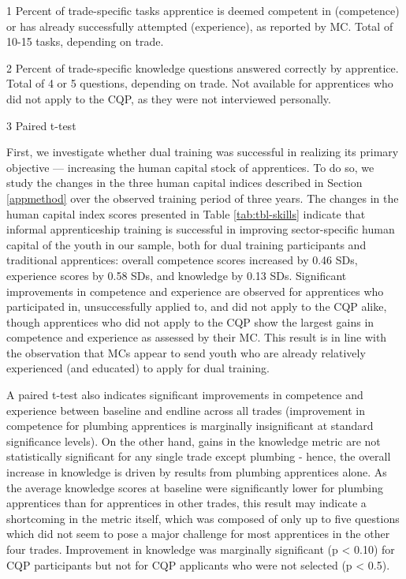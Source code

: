 \documentclass[
  11pt,
a4paper
]{article}
\begin{document}
\begin{table}[H]
{\begin{threeparttable}
\begin{tablenotes}
\item[1] Percent of trade-specific tasks apprentice is deemed competent in (competence) or has already successfully attempted (experience), as reported by MC. Total of 10-15 tasks, depending on trade.
\item[2] Percent of trade-specific knowledge questions answered correctly by apprentice. Total of 4 or 5 questions, depending on trade. Not available for apprentices who did not apply to the CQP, as they were not interviewed personally.
\item[3] Paired t-test
\end{tablenotes}
\end{threeparttable}}
\end{table}

First, we investigate whether dual training was successful in realizing its primary objective --- increasing the human capital stock of apprentices. To do so, we study the changes in the three human capital indices described in Section \ref{appmethod} over the observed training period of three years. The changes in the human capital index scores presented in Table \ref{tab:tbl-skills} indicate that informal apprenticeship training is successful in improving sector-specific human capital of the youth in our sample, both for dual training participants and traditional apprentices: overall competence scores increased by 0.46 SDs, experience scores by 0.58 SDs, and knowledge by 0.13 SDs. Significant improvements in competence and experience are observed for apprentices who participated in, unsuccessfully applied to, and did not apply to the CQP alike, though apprentices who did not apply to the CQP show the largest gains in competence and experience as assessed by their MC. This result is in line with the observation that MCs appear to send youth who are already relatively experienced (and educated) to apply for dual training.

A paired t-test also indicates significant improvements in competence and experience between baseline and endline across all trades (improvement in competence for plumbing apprentices is marginally insignificant at standard significance levels). On the other hand, gains in the knowledge metric are not statistically significant for any single trade except plumbing - hence, the overall increase in knowledge is driven by results from plumbing apprentices alone. As the average knowledge scores at baseline were significantly lower for plumbing apprentices than for apprentices in other trades, this result may indicate a shortcoming in the metric itself, which was composed of only up to five questions which did not seem to pose a major challenge for most apprentices in the other four trades. Improvement in knowledge was marginally significant (p \textless{} 0.10) for CQP participants but not for CQP applicants who were not selected (p \textless{} 0.5).
\end{document}
